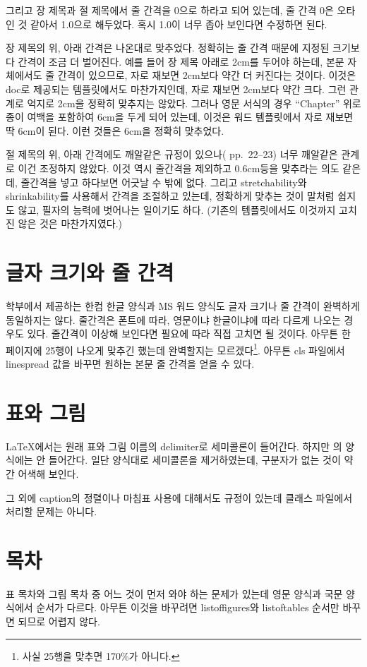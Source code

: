 \documentclass[a4paper]{report}
\begin{document}
그리고 장 제목과 절 제목에서 줄 간격을 0으로 하라고
되어 있는데, 줄 간격 0은 오타인 것 같아서
1.0으로 해두었다. 혹시 1.0이 너무 좁아
보인다면 수정하면 된다.

장 제목의 위, 아래 간격은 나온대로 맞추었다.
정확히는 줄 간격 때문에 지정된 크기보다
간격이 조금 더 벌어진다. 예를 들어
장 제목 아래로 2cm를 두어야 하는데,
본문 자체에서도 줄 간격이 있으므로,
자로 재보면 2cm보다 약간 더 커진다는
것이다. 이것은 doc로 제공되는 템플릿에서도
마찬가지인데, 자로 재보면 2cm보다 약간 크다.
그런 관계로 억지로 2cm을 정확히 맞추지는 않았다.
그러나 영문 서식의 경우 ``Chapter'' 위로
종이 여백을 포함하여 6cm을 두게 되어 있는데,
이것은 워드 템플릿에서 자로 재보면
딱 6cm이 된다. 이런 것들은 6cm을 정확히 맞추었다.

절 제목의 위, 아래 간격에도 깨알같은 규정이
있으나(\cite{grad} pp.~22--23) 너무 깨알같은 관계로 이건 조정하지 않았다.
이것 역시 줄간격을 제외하고 0.6cm등을 맞추라는 의도
같은데, 줄간격을 넣고 하다보면 어긋날 수 밖에 없다.
그리고  stretchability와 shrinkability를
사용해서 간격을 조절하고 있는데, 정확하게 맞추는
것이 말처럼 쉽지도 않고,
필자의 능력에 벗어나는 일이기도 하다.
(기존의 템플릿에서도 이것까지 고치진
않은 것은 마찬가지였다.)

\section{글자 크기와 줄 간격}
학부에서 제공하는 한컴 한글 양식과 MS 워드 양식도
글자 크기나 줄 간격이 완벽하게 동일하지는 않다.
줄간격은 폰트에 따라, 영문이냐 한글이냐에 따라
다르게 나오는 경우도 있다. 줄간격이 이상해 보인다면
필요에 따라 직접 고치면 될 것이다.
아무튼 한 페이지에 25행이 나오게 맞추긴
했는데 완벽할지는 모르겠다\footnote{사실
25행을 맞추면 170\%가 아니다.}.
아무튼 cls 파일에서 linespread 값을
바꾸면 원하는 본문 줄 간격을
얻을 수 있다.

\section{표와 그림}
LaTeX에서는 원래 표와 그림 이름의 delimiter로 세미콜론이 들어간다.
하지만 \cite{grad}의 양식에는 안 들어간다.
일단 양식대로 세미콜론을 제거하였는데,
구분자가 없는 것이 약간 어색해 보인다.

그 외에 caption의 정렬이나 마침표 사용에 대해서도
규정이 있는데 클래스 파일에서 처리할 문제는 아니다.

\section{목차}
표 목차와 그림 목차 중 어느 것이 먼저 와야 하는
문제가 있는데 영문 양식과 국문 양식에서 순서가 다르다.
아무튼 이것을 바꾸려면 listoffigures와 listoftables
순서만 바꾸면 되므로 어렵지 않다.
\end{document}
